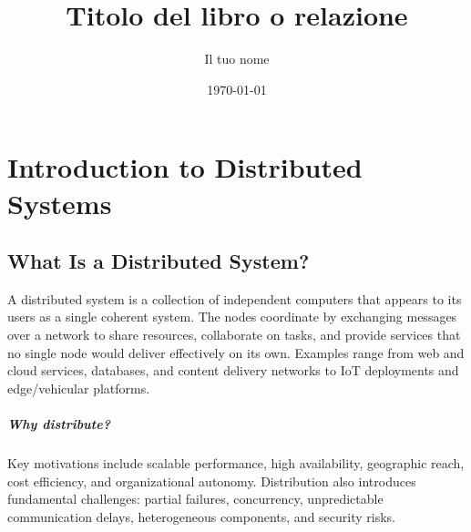 \documentclass[a4paper,12pt]{book}
\title{Titolo del libro o relazione}
\author{Il tuo nome}
\date{\today}
\begin{document}
\frontmatter      %
\maketitle
\tableofcontents  %

\mainmatter 

\chapter{Introduction to Distributed Systems}
\label{ch:introduction}

\section{What Is a Distributed System?}
A distributed system is a collection of independent computers that appears to its users as a single coherent system. The nodes coordinate by exchanging messages over a network to share resources, collaborate on tasks, and provide services that no single node would deliver effectively on its own. Examples range from web and cloud services, databases, and content delivery networks to IoT deployments and edge/vehicular platforms.

\paragraph{Why distribute?} Key motivations include scalable performance, high availability, geographic reach, cost efficiency, and organizational autonomy. Distribution also introduces fundamental challenges: partial failures, concurrency, unpredictable communication delays, heterogeneous components, and security risks.
\end{document}
